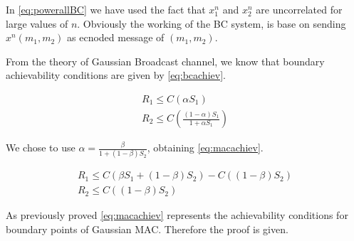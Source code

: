 In \eqref{eq:powerallBC} we have used the fact that $x_1^n$ and $x_2^n$ are uncorrelated for large values of $n$. Obviously the working of the BC system, is base on sending $x^n(m_1,m_2)$  as ecnoded message of $(m_1,m_2)$.

From the theory of Gaussian Broadcast channel, we know that boundary achievability conditions are given by \eqref{eq:bcachiev}.

\begin{equation}
\begin{gathered}
	R_1 \leq C(\alpha S_1) \\
	R_2  \leq C \left( \frac{(1-\alpha )S_1} {1+\alpha S_1} \right)
\end{gathered}
\label{eq:bcachiev}
\end{equation}

We chose to use $\alpha = \frac{\beta}{1+ (1-\beta) S_2}$, obtaining \eqref{eq:macachiev}.

\begin{equation}
\begin{gathered}
	R_1 \leq C (\beta S_1 + (1-\beta)S_2) - C((1-\beta)S_2) \\
	R_2  \leq   C \left( (1-\beta)S_2 \right)
\end{gathered}
\label{eq:macachiev}
\end{equation}

As previously proved \eqref{eq:macachiev} represents the achievability conditions for boundary points of Gaussian MAC. Therefore the proof is given.
